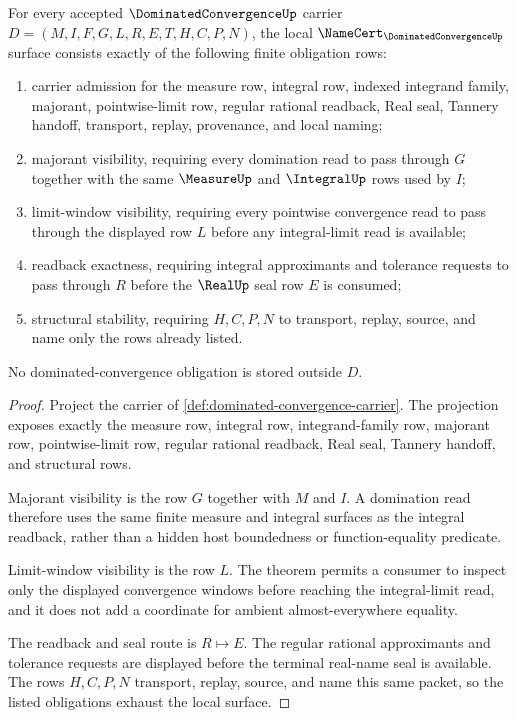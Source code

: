 \begin{theorem}
\label{thm:dominated-convergence-namecert-obligations}
For every accepted $\DominatedConvergenceUp$ carrier $D=(M,I,F,G,L,R,E,T,H,C,P,N)$, the local $\NameCert_{\DominatedConvergenceUp}$ surface consists exactly of the following finite obligation rows:
\begin{enumerate}
\item carrier admission for the measure row, integral row, indexed integrand family, majorant, pointwise-limit row, regular rational readback, Real seal, Tannery handoff, transport, replay, provenance, and local naming;
\item majorant visibility, requiring every domination read to pass through $G$ together with the same $\MeasureUp$ and $\IntegralUp$ rows used by $I$;
\item limit-window visibility, requiring every pointwise convergence read to pass through the displayed row $L$ before any integral-limit read is available;
\item readback exactness, requiring integral approximants and tolerance requests to pass through $R$ before the $\RealUp$ seal row $E$ is consumed;
\item structural stability, requiring $H,C,P,N$ to transport, replay, source, and name only the rows already listed.
\end{enumerate}
No dominated-convergence obligation is stored outside $D$.
\end{theorem}
\begin{proof}
Project the carrier of \autoref{def:dominated-convergence-carrier}. The projection exposes exactly the measure row, integral row, integrand-family row, majorant row, pointwise-limit row, regular rational readback, Real seal, Tannery handoff, and structural rows.

Majorant visibility is the row $G$ together with $M$ and $I$. A domination read therefore uses the same finite measure and integral surfaces as the integral readback, rather than a hidden host boundedness or function-equality predicate.

Limit-window visibility is the row $L$. The theorem permits a consumer to inspect only the displayed convergence windows before reaching the integral-limit read, and it does not add a coordinate for ambient almost-everywhere equality.

The readback and seal route is $R \longmapsto E$. The regular rational approximants and tolerance requests are displayed before the terminal real-name seal is available. The rows $H,C,P,N$ transport, replay, source, and name this same packet, so the listed obligations exhaust the local surface.
\end{proof}

